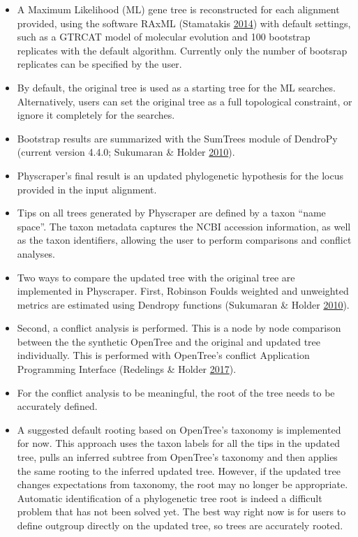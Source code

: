 \documentclass[]{article}
\providecommand{\tightlist}{%
  \setlength{\itemsep}{0pt}\setlength{\parskip}{0pt}}
\begin{document}
\begin{itemize}
\tightlist
\item
  A Maximum Likelihood (ML) gene tree is reconstructed for each alignment provided, using the software RAxML (Stamatakis \protect\hyperlink{ref-stamatakis2014raxml}{2014}) with default settings, such as a GTRCAT model of molecular evolution and 100 bootstrap replicates with the default algorithm. Currently only the number of bootsrap replicates can be specified by the user.
\item
  By default, the original tree is used as a starting tree for the ML searches. Alternatively, users can set the original tree as a full topological constraint, or ignore it completely for the searches.
\item
  Bootstrap results are summarized with the SumTrees module of DendroPy (current version 4.4.0; Sukumaran \& Holder \protect\hyperlink{ref-sukumaran2010dendropy}{2010}).
\item
  Physcraper's final result is an updated phylogenetic hypothesis for the locus provided in the input alignment.
\item
  Tips on all trees generated by Physcraper are defined by a taxon ``name space''. The taxon metadata captures the NCBI accession information, as well as the taxon identifiers, allowing the user to perform comparisons and conflict analyses.
\item
  Two ways to compare the updated tree with the original tree are implemented in Physcraper. First, Robinson Foulds weighted and unweighted metrics are estimated using Dendropy functions (Sukumaran \& Holder \protect\hyperlink{ref-sukumaran2010dendropy}{2010}).
\item
  Second, a conflict analysis is performed. This is a node by node comparison between the the synthetic OpenTree and the original and updated tree individually. This is performed with OpenTree's conflict Application Programming Interface (Redelings \& Holder \protect\hyperlink{ref-redelings2017supertree}{2017}).
\item
  For the conflict analysis to be meaningful, the root of the tree needs to be accurately defined.
\item
  A suggested default rooting based on OpenTree's taxonomy is implemented for now. This approach uses the taxon labels for all the tips in the updated tree, pulls an inferred subtree from OpenTree's taxonomy and then applies the same rooting to the inferred updated tree. However, if the updated tree changes expectations from taxonomy, the root may no longer be appropriate. Automatic identification of a phylogenetic tree root is indeed a difficult problem that has not been solved yet. The best way right now is for users to define outgroup directly on the updated tree, so trees are accurately rooted.
\end{itemize}
\end{document}
